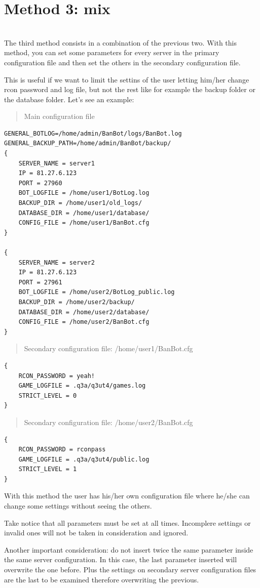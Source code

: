 \documentclass[a4paper]{article}
\begin{document}
\chapter{\textbf{Method 3: mix}}\\
The third method consists in a combination of the previous two. With this method, you can set some parameters for every server
in the primary configuration file and then set the others in the secondary configuration file.

This is useful if we want to limit the settins of the user letting him/her change rcon password and log file, but not the rest like for
example the backup folder or the database folder. Let's see an example:
\begin{quote}
Main configuration file
\end{quote}
\begin{lstlisting}
GENERAL_BOTLOG=/home/admin/BanBot/logs/BanBot.log
GENERAL_BACKUP_PATH=/home/admin/BanBot/backup/
{
	SERVER_NAME = server1
	IP = 81.27.6.123
	PORT = 27960
	BOT_LOGFILE = /home/user1/BotLog.log
	BACKUP_DIR = /home/user1/old_logs/
	DATABASE_DIR = /home/user1/database/
	CONFIG_FILE = /home/user1/BanBot.cfg
}

{
	SERVER_NAME = server2
	IP = 81.27.6.123
	PORT = 27961
	BOT_LOGFILE = /home/user2/BotLog_public.log
	BACKUP_DIR = /home/user2/backup/
	DATABASE_DIR = /home/user2/database/
	CONFIG_FILE = /home/user2/BanBot.cfg
}
\end{lstlisting}
\begin{quote}
Secondary configuration file: /home/user1/BanBot.cfg
\end{quote}
\begin{lstlisting}
{
	RCON_PASSWORD = yeah!
	GAME_LOGFILE = .q3a/q3ut4/games.log
	STRICT_LEVEL = 0
}
\end{lstlisting}
\begin{quote}
Secondary configuration file: /home/user2/BanBot.cfg
\end{quote}
\begin{lstlisting}
{
	RCON_PASSWORD = rconpass
	GAME_LOGFILE = .q3a/q3ut4/public.log
	STRICT_LEVEL = 1
}
\end{lstlisting}
With this method the user has his/her own configuration file where he/she can change some settings without seeing the others.

Take notice that all parameters must be set at all times. Incomplere settings  or invalid ones will not be taken in consideration and ignored.

Another important consideration: do not insert twice the same parameter inside the same server configuration. In this case, the last
parameter inserted will overwrite the one before. Plus the settings on secondary server configuration files are the last to be examined
therefore overwriting the previous.
\end{document}
